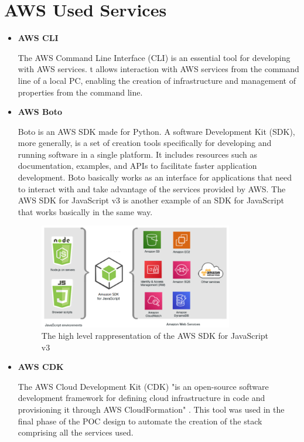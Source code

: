 \section{AWS Used Services}
\begin{itemize}
    \item \textbf{AWS CLI} 
    
    The AWS Command Line Interface (CLI) is an essential tool for developing with AWS services. t allows interaction with AWS services from the command line of a local PC, enabling the creation of infrastructure and management of properties from the command line.
    
    \item \textbf{AWS Boto} 
    
    Boto is an AWS SDK made for Python. A software Development Kit (SDK), more generally, is a set of creation tools specifically for developing and running software in a single platform. It includes resources such as documentation, examples, and APIs to facilitate faster application development. Boto basically works as an interface for applications that need to interact with and take advantage of the services provided by AWS. The AWS SDK for JavaScript v3 is another example of an SDK for JavaScript that works basically in the same way.
    \begin{figure}[h]  %
        \centering
        \includegraphics[width=0.8\textwidth]{images/AWSSDK.png}  %
        \caption{The high level rappresentation of the AWS SDK for JavaScript v3 \cite{AWSSDK}}
        \label{fig:AWSSDK}
    \end{figure}
    
    \item \textbf{AWS CDK} 
    
    The AWS Cloud Development Kit (CDK) "is an open-source software development framework for defining cloud infrastructure in code and provisioning it through AWS CloudFormation" \cite{WhatIsTheAWSCDK}. This tool was used in the final phase of the POC design to automate the creation of the stack comprising all the services used.
    

\end{itemize}
